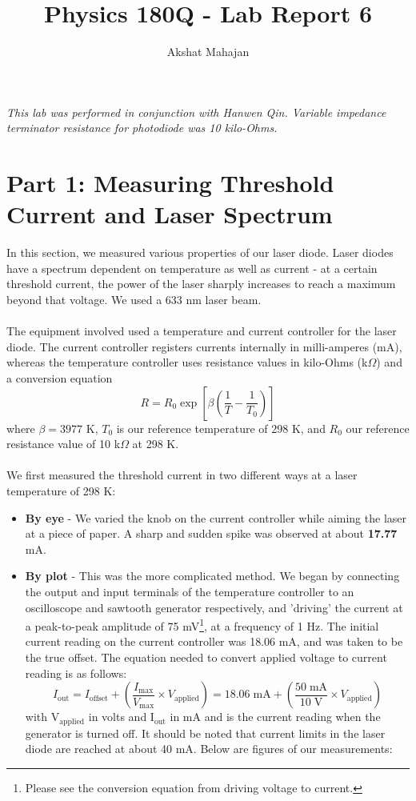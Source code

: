 \documentclass[10pt,a4paper]{article}
\author{Akshat Mahajan}
\title{Physics 180Q - Lab Report 6}
\begin{document}
\maketitle
\noindent \textsl{This lab was performed in conjunction with Hanwen Qin. Variable impedance terminator resistance for photodiode was 10 kilo-Ohms.}
\section*{Part 1: Measuring Threshold Current and Laser Spectrum}
In this section, we measured various properties of our laser diode. Laser diodes have a spectrum dependent on temperature as well as current - at a certain threshold current, the power of the laser sharply increases to reach a maximum beyond that voltage. We used a 633 nm laser beam.\\
\\
The equipment involved used a temperature and current controller for the laser diode. The current controller registers currents internally in milli-amperes (mA), whereas the temperature controller uses resistance values in kilo-Ohms (k$\Omega$) and a conversion equation 
$$ R = R_{0}\exp{\left[\beta\left(\dfrac{1}{T} - \dfrac{1}{T_{0}}\right)\right]}$$
where $\beta = 3977$ K, $T_{0}$ is our reference temperature of 298 K, and $R_{0}$ our reference resistance value of 10 k$\Omega$ at 298 K.\\
\\
We first measured the threshold current in two different ways at a laser temperature of 298 K:
\begin{itemize}
\item \textbf{By eye} - We varied the knob on the current controller while aiming the laser at a piece of paper. A sharp and sudden spike was observed at about \textbf{17.77} mA.
\item \textbf{By plot} - This was the more complicated method. We began by connecting the output and input terminals of the temperature controller to an oscilloscope and sawtooth generator respectively, and 'driving' the current at a peak-to-peak amplitude of 75 mV\footnote{Please see the conversion equation from driving voltage to current.}, at a frequency of 1 Hz. The initial current reading on the current controller was 18.06 mA, and was taken to be the true offset. The equation needed to convert applied voltage to current reading is as follows:
$$ I_{\mathrm{out}} = I_{\mathrm{offset}} +\left( \dfrac{I_{\mathrm{max}}}{V_{\mathrm{max}}}\times V_{\mathrm{applied}} \right) = 18.06\;\mathrm{mA} + \left( \dfrac{50\;\mathrm{mA}}{10\;\mathrm{V}}\times V_{\mathrm{applied}} \right)$$
with V$_{\mathrm{applied}}$ in volts and I$_{\mathrm{out}}$ in mA and is the current reading when the generator is turned off. It should be noted that current limits in the laser diode are reached at about 40 mA. Below are figures of our measurements:
\end{itemize}
\end{document}
